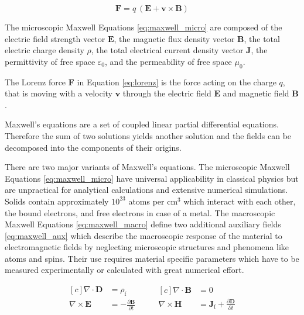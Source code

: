 \begin{equation}
\label{eq:lorenz}
    \bm{F} = q\ (\bm{E} + \bm{v} \times \bm{B})
\end{equation}

The microscopic Maxwell Equations \ref{eq:maxwell_micro} are composed of the electric field strength vector $\bm{E}$, the magnetic flux density vector $\bm{B}$, the total electric charge density $\rho$, the total electrical current density vector $\bm{J}$, the permittivity of free space $\varepsilon_0$, and the permeability of free space $\mu_0$.

The Lorenz force $\bm{F}$ in Equation \ref{eq:lorenz} is the force acting on the charge $q$, that is moving with a velocity $\bm{v}$ through the electric field $\bm{E}$ and magnetic field $\bm{B}$.

Maxwell's equations are a set of coupled linear partial differential equations. Therefore the sum of two solutions yields another solution and the fields can be decomposed into the components of their origins.

There are two major variants of Maxwell's equations. The microscopic Maxwell Equations \ref{eq:maxwell_micro} have universal applicability in classical physics but are unpractical for analytical calculations and extensive numerical simulations. Solids contain approximately $10^{23}$ atoms per cm$^3$ which interact with each other, the bound electrons, and free electrons in case of a metal. The macroscopic Maxwell Equations \ref{eq:maxwell_macro} define two additional auxiliary fields \ref{eq:maxwell_aux} which describe the macroscopic response of the material to electromagnetic fields by neglecting microscopic structures and phenomena like atoms and spins. Their use requires material specific parameters which have to be measured experimentally or calculated with great numerical effort.

\begin{equation}
\label{eq:maxwell_macro}
    \begin{aligned}[c]
        \nabla \cdot \bm{D} &= \rho_\text{f}\\
        \nabla \times \bm{E} &= -\frac{\partial \bm{B}}{\partial t}\\
    \end{aligned}
    \qquad
    \begin{aligned}[c]
        \nabla \cdot \bm{B} &= 0\\
        \nabla \times \bm{H} &= \bm{J}_\text{f} + \frac{\partial \bm{D}}{\partial t}\\
    \end{aligned}
\end{equation}

